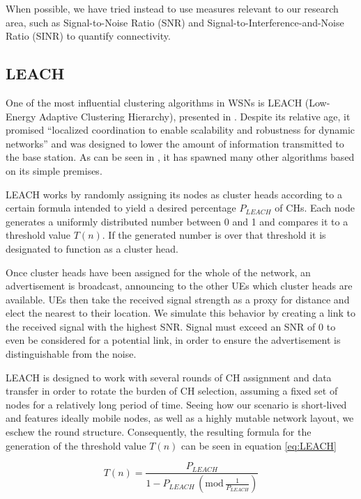When possible, we have tried instead to use measures relevant to our research area, such as Signal-to-Noise Ratio (SNR) and Signal-to-Interference-and-Noise Ratio (SINR) to quantify connectivity. 

\subsection{LEACH} \label{LEACH}
One of the most influential clustering algorithms in WSNs is LEACH (Low-Energy Adaptive Clustering Hierarchy), presented in \cite{Heinzelman2000}. Despite its relative age, it promised ``localized coordination to enable scalability and robustness for dynamic networks'' and was designed to lower the amount of information transmitted to the base station. As can be seen in \cite{Afsar2014}, it has spawned many other algorithms based on its simple premises. 

LEACH works by randomly assigning its nodes as cluster heads according to a certain formula intended to yield a desired percentage $P_{LEACH}$ of CHs. Each node generates a uniformly distributed number between 0 and 1 and compares it to a threshold value $T(n)$. If the generated number is over that threshold it is designated to function as a cluster head.

Once cluster heads have been assigned for the whole of the network, an advertisement is broadcast, announcing to the other UEs which cluster heads are available. UEs then take the received signal strength as a proxy for distance and elect the nearest to their location. We simulate this behavior by creating a link to the received signal with the highest SNR. Signal must exceed an SNR of 0 to even be considered for a potential link, in order to ensure the advertisement is distinguishable from the noise. 

LEACH is designed to work with several rounds of CH assignment and data transfer in order to rotate the burden of CH selection, assuming a fixed set of nodes for a relatively long period of time. Seeing how our scenario is short-lived and features ideally mobile nodes, as well as a highly mutable network layout, we eschew the round structure. Consequently, the resulting  formula for the generation of the threshold value $T(n)$ can be seen in equation \ref{eq:LEACH}

\begin{equation}\label{eq:LEACH}
T(n) = \frac {P_{LEACH}}{1-P_{LEACH}\,(\text{mod}\,\frac {1}{P_{LEACH}})}
\end{equation}

